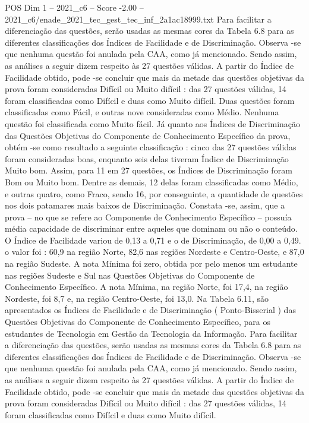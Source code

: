 \begin{textsample}{POS Dim 1 – 2021\_c6 – Score -2.00 – 2021\_c6/enade\_2021\_tec\_gest\_tec\_inf\_2a1ac18999.txt}
Para facilitar a diferenciação das questões, serão usadas as mesmas cores da Tabela 6.8 para as diferentes classificações dos Índices de Facilidade e de Discriminação.
Observa -se que nenhuma questão foi anulada pela CAA, como já mencionado.
Sendo assim, as análises a seguir dizem respeito às 27 questões válidas.
A partir do Índice de Facilidade obtido, pode -se concluir que mais da metade das questões objetivas da prova foram consideradas Difícil ou Muito difícil : das 27 questões válidas, 14 foram classificadas como Difícil e duas como Muito difícil.
Duas questões foram classificadas como Fácil, e outras nove consideradas como Médio.
Nenhuma questão foi classificada como Muito fácil.
Já quanto aos Índices de Discriminação das Questões Objetivas do Componente de Conhecimento Específico da prova, obtém -se como resultado a seguinte classificação : cinco das 27 questões válidas foram consideradas boas, enquanto seis delas tiveram Índice de Discriminação Muito bom.
Assim, para 11 em 27 questões, os Índices de Discriminação foram Bom ou Muito bom.
Dentre as demais, 12 delas foram classificadas como Médio, e outras quatro, como Fraco, sendo 16, por conseguinte, a quantidade de questões nos dois patamares mais baixos de Discriminação.
Constata -se, assim, que a prova – no que se refere ao Componente de Conhecimento Específico – possuía média capacidade de discriminar entre aqueles que dominam ou não o conteúdo.
O Índice de Facilidade variou de 0,13 a 0,71 e o de Discriminação, de 0,00 a 0,49. o valor foi : 60,9 na região Norte, 82,6 nas regiões Nordeste e Centro-Oeste, e 87,0 na região Sudeste.
A nota Mínima foi zero, obtida por pelo menos um estudante nas regiões Sudeste e Sul nas Questões Objetivas do Componente de Conhecimento Específico.
A nota Mínima, na região Norte, foi 17,4, na região Nordeste, foi 8,7 e, na região Centro-Oeste, foi 13,0.
Na Tabela 6.11, são apresentados os Índices de Facilidade e de Discriminação ( Ponto-Bisserial ) das Questões Objetivas do Componente de Conhecimento Específico, para os estudantes de Tecnologia em Gestão da Tecnologia da Informação.
Para facilitar a diferenciação das questões, serão usadas as mesmas cores da Tabela 6.8 para as diferentes classificações dos Índices de Facilidade e de Discriminação.
Observa -se que nenhuma questão foi anulada pela CAA, como já mencionado.
Sendo assim, as análises a seguir dizem respeito às 27 questões válidas.
A partir do Índice de Facilidade obtido, pode -se concluir que mais da metade das questões objetivas da prova foram consideradas Difícil ou Muito difícil : das 27 questões válidas, 14 foram classificadas como Difícil e duas como Muito difícil.

\end{textsample}
